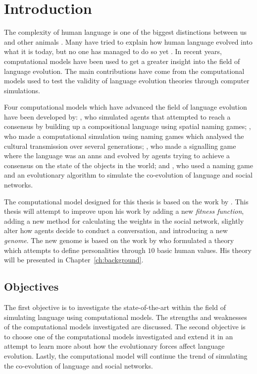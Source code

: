 \acresetall
\chapter{Introduction}
The complexity of human language is one of the biggest distinctions between us and other animals \citep{hauser2002faculty}. Many have tried to explain how human language evolved into what it is today, but no one has managed to do so yet \citep{chomsky1986knowledge, pinker1990natural, muller1861theoretical}. In recent years, computational models have been used to get a greater insight into the field of language evolution. The main contributions have come from the computational models used to test the validity of language evolution theories through computer simulations.

Four computational models which have advanced the field of language evolution have been developed by: \citeauthor{gong2011simulating}, who simulated agents that attempted to reach a consensus by building up a compositional language using spatial naming games; \citeauthor{lipowska2011naming}, who made a computational simulation using naming games which analysed the cultural transmission over several generations; \citeauthor{munroe2002learning}, who made a signalling game where the language was an \acp{ann} and evolved by agents trying to achieve a consensus on the state of the objects in the world; and \citeauthor{lekvam2014co}, who used a naming game and an evolutionary algorithm to simulate the co-evolution of language and social networks.

The computational model designed for this thesis is based on the work by \citeauthor{lekvam2014co}. This thesis will attempt to improve upon his work by adding a new \textit{fitness function}, adding a new method for calculating the weights in the social network, slightly alter how agents decide to conduct a conversation, and introducing a new \textit{genome}. The new genome is based on the work by \citeauthor{schwartz1992unniversals} who formulated a theory which attempts to define personalities through $10$ basic human values. His theory will be presented in Chapter~\ref{ch:background}.

\section{Objectives}
The first objective is to investigate the state-of-the-art within the field of simulating language using computational models. The strengths and weaknesses of the computational models investigated are discussed. The second objective is to choose one of the computational models investigated and extend it in an attempt to learn more about how the evolutionary forces affect language evolution. Lastly, the computational model will continue the trend of simulating the co-evolution of language and social networks.


